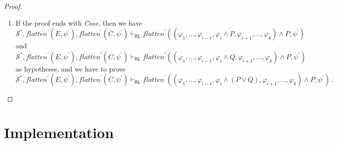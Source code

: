 \documentclass{article}
\newcommand{\RL}{\mathsf{RL}}
\begin{document}
\begin{proof}
\begin{enumerate}
    \item If the proof ends with \emph{Case}, then we have
        \begin{equation*}
            \mathcal{S}^*, \mathit{flatten}^\prime(E, \psi^\prime), \mathit{flatten}^\prime(C, \psi^\prime) \vdash_\RL
            \mathit{flatten}^\prime((\varphi_1, \ldots, \varphi_{i-1}, \varphi_i \land P, \varphi_{i+1}, \ldots, \varphi_k) \land P, \psi^\prime)
        \end{equation*}
        and
        \begin{equation*}
            \mathcal{S}^*, \mathit{flatten}^\prime(E, \psi^\prime), \mathit{flatten}^\prime(C, \psi^\prime) \vdash_\RL
            \mathit{flatten}^\prime((\varphi_1, \ldots, \varphi_{i-1}, \varphi_i \land Q, \varphi_{i+1}, \ldots, \varphi_k) \land P, \psi^\prime) 
        \end{equation*}
        as hypotheses, and we have to prove
        \begin{equation*}
            \mathcal{S}^*, \mathit{flatten}^\prime(E, \psi^\prime), \mathit{flatten}^\prime(C, \psi^\prime) \vdash_\RL
            \mathit{flatten}^\prime((\varphi_1, \ldots, \varphi_{i-1}, \varphi_i \land (P \lor Q), \varphi_{i+1}, \ldots, \varphi_k) \land P, \psi^\prime)               \, .
        \end{equation*}
\end{enumerate}
\end{proof}

\section{Implementation}




\appendix
\end{document}
